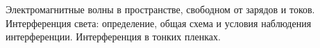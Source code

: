 \documentclass[__main__.tex]{subfiles}
\begin{document}
Электромагнитные волны в пространстве, свободном от зарядов и токов. Интерференция света: определение, общая схема и условия наблюдения интерференции. Интерференция в тонких пленках.\\ 

\end{document}
